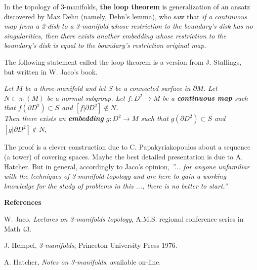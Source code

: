 \documentclass[12pt]{article}
\begin{document}
In the topology of 3-manifolds, {\bf the loop theorem} is generalization of an ansatz discovered by Max Dehn (namely, Dehn's lemma), 
who saw that {\em if a continuous map from a 2-disk to a 3-manifold whose restriction to the boundary's disk has no singularities, 
then there exists another embedding whose restriction to the boundary's disk is equal to the boundary's restriction original map}.

The following statement called the loop theorem is a version from J. Stallings, but written in W. Jaco's book.

{\em Let $M$ be a three-manifold and let $S$
 be a connected surface in $\partial M $. Let $N\subset \pi_1(M)$ be a normal subgroup.
Let  $f \colon D^2\to M $
be a {\bf continuous map} such that $f(\partial D^2)\subset S$
and $[f|\partial D^2]\notin N$.\\
Then there exists an {\bf embedding} 
$g\colon D^2\to M $ such that 
$g(\partial D^2)\subset S$
and 
$[g|\partial D^2]\notin N$},

The proof is a clever construction due to C. Papakyriakopoulos about a sequence (a tower) of covering spaces.
Maybe the best detailed presentation is due to A. Hatcher.
But in general, accordingly to  Jaco's opinion, {\it ''... for anyone unfamiliar with the techniques of 3-manifold-topology and are here to gain a working knowledge  for the study of problems in this 
..., there is no better 
 to start.''}



{\bf References}

W. Jaco, {\it Lectures on 3-manifolds topology}, A.M.S. regional conference series in Math 43.

J. Hempel, {\it 3-manifolds}, Princeton University Press 1976.

A. Hatcher, {\it Notes on 3-manifolds}, available on-line.
\end{document}
